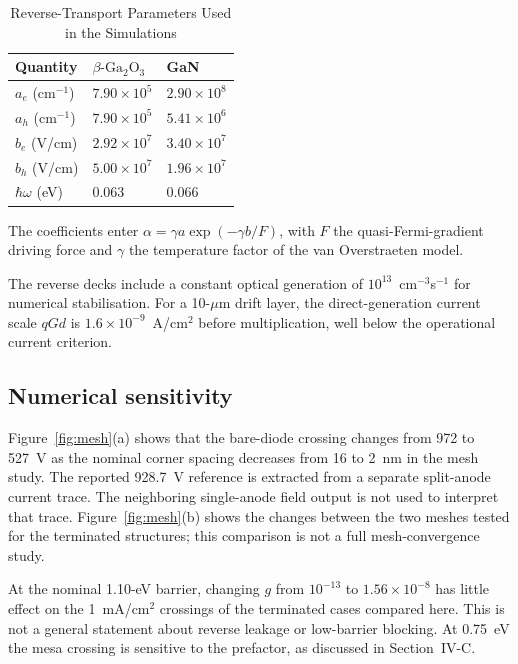 \documentclass[journal,10pt]{IEEEtran}
\newcommand{\GaO}{\ensuremath{\beta\text{-}\mathrm{Ga}_2\mathrm{O}_3}}
\begin{document}
\begin{table}[!t]
\caption{Reverse-Transport Parameters Used in the Simulations}
\label{tab:model}
\centering\footnotesize
\begin{tabular}{lll}
\toprule
Quantity & \GaO & GaN\\
\midrule
$a_e$ (cm$^{-1}$) & $7.90\times10^5$ & $2.90\times10^8$\\
$a_h$ (cm$^{-1}$) & $7.90\times10^5$ & $5.41\times10^6$\\
$b_e$ (V/cm) & $2.92\times10^7$ & $3.40\times10^7$\\
$b_h$ (V/cm) & $5.00\times10^7$ & $1.96\times10^7$\\
$\hbar\omega$ (eV) & 0.063 & 0.066\\
\bottomrule
\end{tabular}
\par\smallskip\begin{minipage}{0.98\columnwidth}\footnotesize
The coefficients enter $\alpha=\gamma a\exp(-\gamma b/F)$, with $F$ the quasi-Fermi-gradient driving force and $\gamma$ the temperature factor of the van Overstraeten model.
\end{minipage}
\end{table}

The reverse decks include a constant optical generation of $10^{13}$~cm$^{-3}$s$^{-1}$ for numerical stabilisation. For a 10-$\mu$m drift layer, the direct-generation current scale $qGd$ is $1.6\times10^{-9}$~A/cm$^2$ before multiplication, well below the operational current criterion.

\subsection{Numerical sensitivity}
Figure~\ref{fig:mesh}(a) shows that the bare-diode crossing changes from 972 to 527~V as the nominal corner spacing decreases from 16 to 2~nm in the mesh study. The reported 928.7~V reference is extracted from a separate split-anode current trace. The neighboring single-anode field output is not used to interpret that trace. Figure~\ref{fig:mesh}(b) shows the changes between the two meshes tested for the terminated structures; this comparison is not a full mesh-convergence study.

At the nominal 1.10-eV barrier, changing $g$ from $10^{-13}$ to $1.56\times10^{-8}$ has little effect on the 1~mA/cm$^2$ crossings of the terminated cases compared here. This is not a general statement about reverse leakage or low-barrier blocking. At 0.75~eV the mesa crossing is sensitive to the prefactor, as discussed in Section~IV-C.
\end{document}
